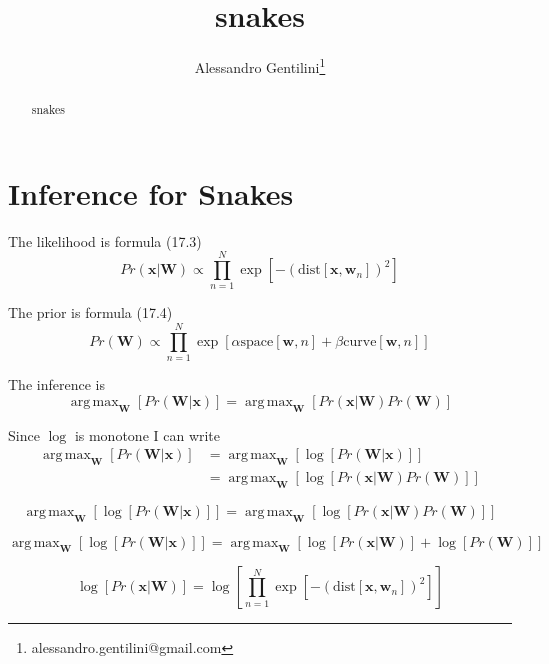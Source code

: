 \documentclass[a4paper,12pt]{article}
\title{snakes}
\author{Alessandro Gentilini\thanks{alessandro.gentilini@gmail.com}}
\DeclareMathOperator*{\argmax}{arg\,max}
\begin{document}
\maketitle

\begin{abstract}
snakes
\end{abstract} 

\section{Inference for Snakes}
The likelihood is formula (17.3)
\begin{equation}
Pr(\mathbf{x}\vert\mathbf{W})\propto \prod_{n=1}^N \exp{[-(\text{dist}[\mathbf{x},\mathbf{w}_n])^2]}
\end{equation}

The prior is formula (17.4)
\begin{equation}
Pr(\mathbf{W})\propto \prod_{n=1}^N \exp{[\alpha \text{space}[\mathbf{w},n]+\beta \text{curve}[\mathbf{w},n]]}
\end{equation}

The inference is 
\begin{equation}
\argmax_{\mathbf{W}}[Pr(\mathbf{W}\vert\mathbf{x})] = 
\argmax_{\mathbf{W}}[Pr(\mathbf{x}\vert\mathbf{W})Pr(\mathbf{W})]
\end{equation}

Since $\log$ is monotone I can write
\begin{equation}
\begin{split}
\argmax_{\mathbf{W}}[Pr(\mathbf{W}\vert\mathbf{x})] & = 
\argmax_{\mathbf{W}}[\log{[Pr(\mathbf{W}\vert\mathbf{x})]}] \\
& = \argmax_{\mathbf{W}}[\log{[Pr(\mathbf{x}\vert\mathbf{W})Pr(\mathbf{W})]}]
\end{split}
\end{equation}

\begin{equation}
\argmax_{\mathbf{W}}[\log{[Pr(\mathbf{W}\vert\mathbf{x})]}] = 
\argmax_{\mathbf{W}}[\log{[Pr(\mathbf{x}\vert\mathbf{W})Pr(\mathbf{W})]}]
\end{equation}

\begin{equation}
\argmax_{\mathbf{W}}[\log{[Pr(\mathbf{W}\vert\mathbf{x})]}] = 
\argmax_{\mathbf{W}}[\log{[Pr(\mathbf{x}\vert\mathbf{W})]}+\log{[Pr(\mathbf{W})]}]
\end{equation}

\begin{equation}
\log{[Pr(\mathbf{x}\vert\mathbf{W})]}= \log{[\prod_{n=1}^N \exp{[-(\text{dist}[\mathbf{x},\mathbf{w}_n])^2]}]}
\end{equation}
\end{document}
